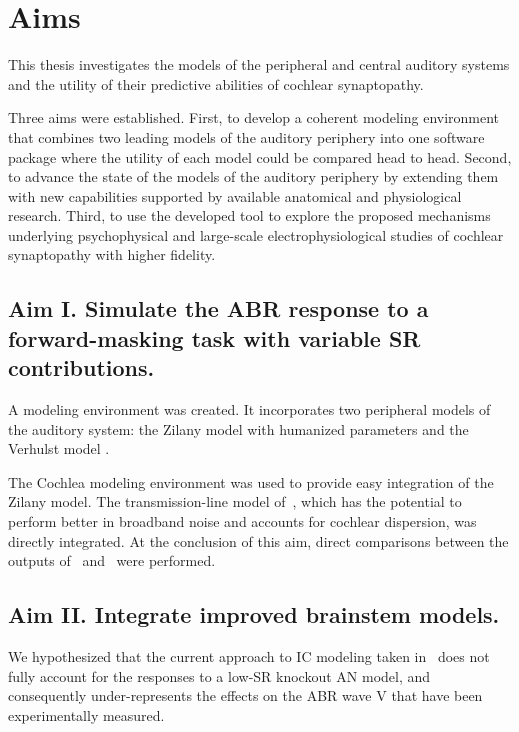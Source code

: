 \chapter{Aims}
\label{chapter:Aims}
\thispagestyle{myheadings}
This thesis investigates the models of the peripheral and central auditory systems and the utility of their predictive abilities of cochlear synaptopathy. 

Three aims were established.  First, to develop a coherent modeling environment that combines two leading models of the auditory periphery into one software package where the utility of each model could be compared head to head.  Second, to advance the state of the models of the auditory periphery by extending them with new capabilities supported by available anatomical and physiological research.  Third, to use the developed tool to explore the proposed mechanisms underlying psychophysical and large-scale electrophysiological studies of cochlear synaptopathy with higher fidelity.


\section{Aim I. Simulate the ABR response to a forward-masking task with variable SR contributions.}
A modeling environment was created.  It incorporates two peripheral models of the auditory system: the Zilany model with humanized parameters \citep{Zilany2014Updated} and the Verhulst model \citep{Verhulst2015Functional}.  

The Cochlea modeling environment \citep{Rudnicki2014Cochlea} was used to provide easy integration of the Zilany model. The transmission-line model of~\cite{Verhulst2015Functional}, which has the potential to perform better in broadband noise and accounts for cochlear dispersion, was directly integrated.
At the conclusion of this aim, direct comparisons between the outputs of~\cite{Zilany2014Updated} and~\cite{Verhulst2015Functional} were performed.

\section{Aim II. Integrate improved brainstem models.}  

We hypothesized that the current approach to IC modeling taken in~\cite{Verhulst2015Functional,Mehraei2016Auditory} does not fully account for the responses to a low-SR knockout AN model, and consequently under-represents the effects on the ABR wave V that have been experimentally measured.  

